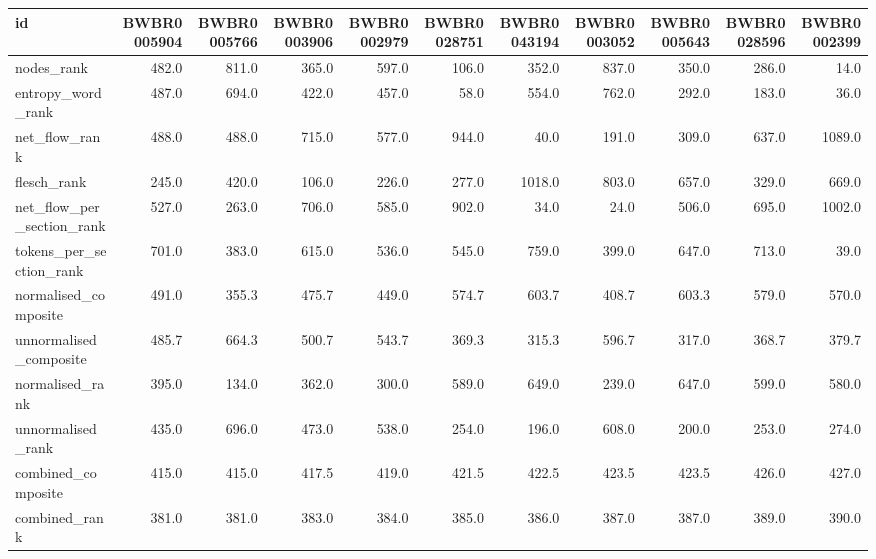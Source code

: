 \begin{tabular}{lrrrrrrrrrr}
\toprule
id & BWBR0005904 & BWBR0005766 & BWBR0003906 & BWBR0002979 & BWBR0028751 & BWBR0043194 & BWBR0003052 & BWBR0005643 & BWBR0028596 & BWBR0002399 \\
\midrule
nodes\_rank & 482.0 & 811.0 & 365.0 & 597.0 & 106.0 & 352.0 & 837.0 & 350.0 & 286.0 & 14.0 \\
\cline{1-11}
entropy\_word\_rank & 487.0 & 694.0 & 422.0 & 457.0 & 58.0 & 554.0 & 762.0 & 292.0 & 183.0 & 36.0 \\
\cline{1-11}
net\_flow\_rank & 488.0 & 488.0 & 715.0 & 577.0 & 944.0 & 40.0 & 191.0 & 309.0 & 637.0 & 1089.0 \\
\cline{1-11}
flesch\_rank & 245.0 & 420.0 & 106.0 & 226.0 & 277.0 & 1018.0 & 803.0 & 657.0 & 329.0 & 669.0 \\
\cline{1-11}
net\_flow\_per\_section\_rank & 527.0 & 263.0 & 706.0 & 585.0 & 902.0 & 34.0 & 24.0 & 506.0 & 695.0 & 1002.0 \\
\cline{1-11}
tokens\_per\_section\_rank & 701.0 & 383.0 & 615.0 & 536.0 & 545.0 & 759.0 & 399.0 & 647.0 & 713.0 & 39.0 \\
\cline{1-11}
normalised\_composite & 491.0 & 355.3 & 475.7 & 449.0 & 574.7 & 603.7 & 408.7 & 603.3 & 579.0 & 570.0 \\
\cline{1-11}
unnormalised\_composite & 485.7 & 664.3 & 500.7 & 543.7 & 369.3 & 315.3 & 596.7 & 317.0 & 368.7 & 379.7 \\
\cline{1-11}
normalised\_rank & 395.0 & 134.0 & 362.0 & 300.0 & 589.0 & 649.0 & 239.0 & 647.0 & 599.0 & 580.0 \\
\cline{1-11}
unnormalised\_rank & 435.0 & 696.0 & 473.0 & 538.0 & 254.0 & 196.0 & 608.0 & 200.0 & 253.0 & 274.0 \\
\cline{1-11}
combined\_composite & 415.0 & 415.0 & 417.5 & 419.0 & 421.5 & 422.5 & 423.5 & 423.5 & 426.0 & 427.0 \\
\cline{1-11}
combined\_rank & 381.0 & 381.0 & 383.0 & 384.0 & 385.0 & 386.0 & 387.0 & 387.0 & 389.0 & 390.0 \\
\cline{1-11}
\bottomrule
\end{tabular}
